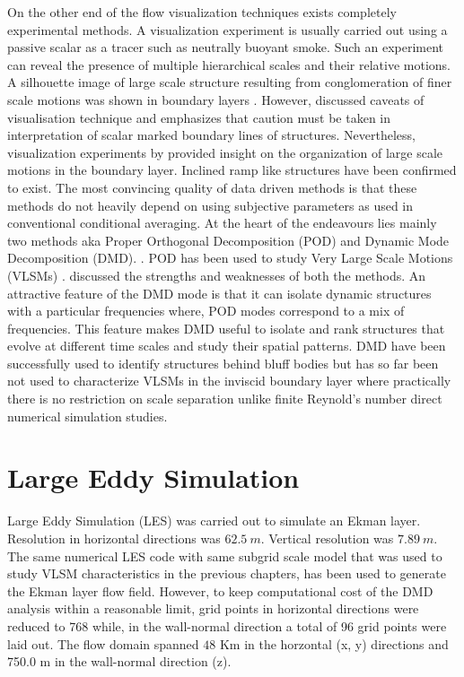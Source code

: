 \documentclass{article}
\begin{document}
On the other end of the flow visualization techniques exists completely experimental methods. A visualization experiment is usually carried out using a passive scalar as a tracer such as neutrally buoyant smoke. Such an experiment can reveal the presence of multiple hierarchical scales and their relative motions. A silhouette image of large scale structure resulting from conglomeration of finer scale motions was shown in boundary layers \citep{falco_pof_77, hommema_adrian_blm_03}. However, \citet{hussain_1986_jfm} discussed caveats of visualisation technique and emphasizes that caution must be taken in interpretation of scalar marked boundary lines of structures. Nevertheless, visualization experiments by \citet{falco_pof_77, hommema_adrian_blm_03} provided insight on the organization of large scale motions in the boundary layer. Inclined ramp like structures have been confirmed to exist. The most convincing quality of data driven methods is that these methods do not heavily depend on using subjective parameters as used in conventional conditional averaging. At the heart of the endeavours lies mainly two methods aka Proper Orthogonal Decomposition (POD) \citep[eg. ][]{li_bouzeid_blm_2011,muld_compFluids_2012} and Dynamic Mode Decomposition (DMD). \citep[eg. ][]{bagheri_jfm2013,liu_ExpF_2015,muld_compFluids_2012}. POD has been used to study Very Large Scale Motions (VLSMs) \citep[][]{Hellstrom_pof_2011,bailey_smits_jfm_2010}. \citet{taira_arxiv_2017} discussed the strengths and weaknesses of both the methods. An attractive feature of the DMD mode is that it can isolate dynamic structures with a particular frequencies where, POD modes correspond to a mix of frequencies. This feature makes DMD useful to isolate and rank structures that evolve at different time scales and study their spatial patterns. DMD have been successfully used to identify structures behind bluff bodies but has so far been not used to characterize VLSMs in the inviscid boundary layer where practically there is no restriction on scale separation unlike finite Reynold's number direct numerical simulation studies. 
\section{Large Eddy Simulation}
Large Eddy Simulation (LES) was carried out to simulate an Ekman layer. Resolution in horizontal directions was $62.5\ m$. Vertical resolution was $7.89\ m$. The same numerical LES code with same subgrid scale model that was used to study VLSM characteristics in the previous chapters, has been used to generate the Ekman layer flow field. However, to keep computational cost of the DMD analysis within a reasonable limit, grid points in horizontal directions were reduced to 768 while, in the wall-normal direction a total of 96 grid points were laid out. The flow domain spanned $48$ Km in the horzontal (x, y) directions and 750.0 m in the wall-normal direction (z). 
\end{document}
